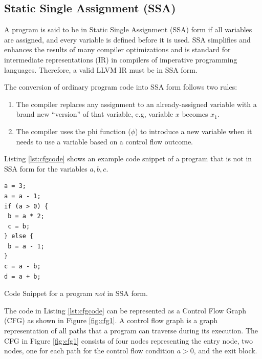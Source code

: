 \subsection{Static Single Assignment (SSA)}
A program is said to be in Static Single Assignment (SSA) \cite{ssa} form if all variables are assigned, and every variable is defined before it is used. SSA simplifies and enhances the results of many compiler optimizations and is standard for intermediate representations (IR) in compilers of imperative programming languages. Therefore, a valid LLVM IR must be in SSA form.

\noindent The conversion of ordinary program code into SSA form follows two rules:
\begin{enumerate}
    \item The compiler replaces any assignment to an already-assigned variable with a brand new “version” of that variable, e.g, variable \texttt{\textbf{$x$}} becomes \texttt{\textbf{$x_1$}}.
    \item The compiler uses the phi function ($\phi$) to introduce a new variable when it needs to use a variable based on a control flow outcome.
\end{enumerate}

Listing \ref{lst:cfgcode} shows an example code snippet of a program that is not in SSA form for the variables $a, b, c$.

\begin{listing}[htbp]
\begin{verbatim}
a = 3;
a = a - 1;
if (a > 0) {
 b = a * 2;
 c = b;
} else {
 b = a - 1;
}
c = a - b;
d = a + b;
\end{verbatim}
\caption{Code Snippet for a program \textit{not} in SSA form.}\label{lst:cfgcode}
\end{listing}

The code in Listing \ref{lst:cfgcode} can be represented as a Control Flow Graph (CFG) as shown in Figure \ref{fig:cfg1}. A control flow graph is a graph representation of all paths that a program can traverse during its execution. The CFG in Figure \ref{fig:cfg1} consists of four nodes representing the entry node, two nodes, one for each path for the control flow condition $a > 0$, and the exit block.


